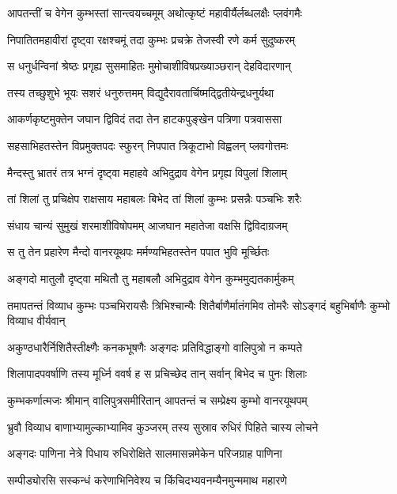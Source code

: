 \twolineshloka
{आपतन्तीं च वेगेन कुम्भस्तां सान्त्वयच्चमूम्}
{अथोत्कृष्टं महावीर्यैर्लब्धलक्षैः प्लवंगमैः} %

\twolineshloka
{निपातितमहावीरां दृष्ट्वा रक्षश्चमूं तदा}
{कुम्भः प्रचक्रे तेजस्वी रणे कर्म सुदुष्करम्} %

\twolineshloka
{स धनुर्धन्विनां श्रेष्ठः प्रगृह्य सुसमाहितः}
{मुमोचाशीविषप्रख्याञ्छरान् देहविदारणान्} %

\twolineshloka
{तस्य तच्छुशुभे भूयः सशरं धनुरुत्तमम्}
{विद्युदैरावतार्चिष्मद्द्वितीयेन्द्रधनुर्यथा} %

\twolineshloka
{आकर्णकृष्टमुक्तेन जघान द्विविदं तदा}
{तेन हाटकपुङ्खेन पत्रिणा पत्रवाससा} %

\twolineshloka
{सहसाभिहतस्तेन विप्रमुक्तपदः स्फुरन्}
{निपपात त्रिकूटाभो विह्वलन् प्लवगोत्तमः} %

\twolineshloka
{मैन्दस्तु भ्रातरं तत्र भग्नं दृष्ट्वा महाहवे}
{अभिदुद्राव वेगेन प्रगृह्य विपुलां शिलाम्} %

\twolineshloka
{तां शिलां तु प्रचिक्षेप राक्षसाय महाबलः}
{बिभेद तां शिलां कुम्भः प्रसन्नैः पञ्चभिः शरैः} %

\twolineshloka
{संधाय चान्यं सुमुखं शरमाशीविषोपमम्}
{आजघान महातेजा वक्षसि द्विविदाग्रजम्} %

\twolineshloka
{स तु तेन प्रहारेण मैन्दो वानरयूथपः}
{मर्मण्यभिहतस्तेन पपात भुवि मूर्च्छितः} %

\twolineshloka
{अङ्गदो मातुलौ दृष्ट्वा मथितौ तु महाबलौ}
{अभिदुद्राव वेगेन कुम्भमुद्यतकार्मुकम्} %

\threelineshloka
{तमापतन्तं विव्याध कुम्भः पञ्चभिरायसैः}
{त्रिभिश्चान्यैः शितैर्बाणैर्मातंगमिव तोमरैः}
{सोऽङ्गदं बहुभिर्बाणैः कुम्भो विव्याध वीर्यवान्} %

\twolineshloka
{अकुण्ठधारैर्निशितैस्तीक्ष्णैः कनकभूषणैः}
{अङ्गदः प्रतिविद्धाङ्गो वालिपुत्रो न कम्पते} %

\twolineshloka
{शिलापादपवर्षाणि तस्य मूर्ध्नि ववर्ष ह}
{स प्रचिच्छेद तान् सर्वान् बिभेद च पुनः शिलाः} %

\twolineshloka
{कुम्भकर्णात्मजः श्रीमान् वालिपुत्रसमीरितान्}
{आपतन्तं च सम्प्रेक्ष्य कुम्भो वानरयूथपम्} %

\twolineshloka
{भ्रुवौ विव्याध बाणाभ्यामुल्काभ्यामिव कुञ्जरम्}
{तस्य सुस्राव रुधिरं पिहिते चास्य लोचने} %

\twolineshloka
{अङ्गदः पाणिना नेत्रे पिधाय रुधिरोक्षिते}
{सालमासन्नमेकेन परिजग्राह पाणिना} %

\twolineshloka
{सम्पीड्योरसि सस्कन्धं करेणाभिनिवेश्य च}
{किंचिदभ्यवनम्यैनमुन्ममाथ महारणे} %

